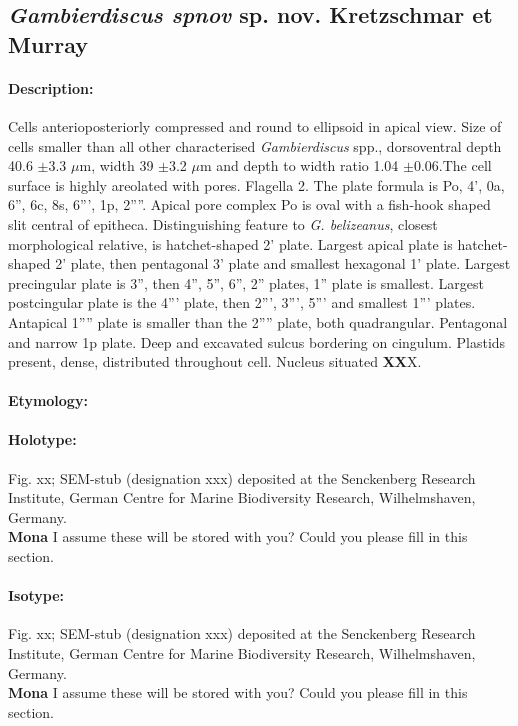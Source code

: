 \documentclass[12pt]{article}
\begin{document}
 \subsection{\emph{Gambierdiscus spnov} sp. nov. Kretzschmar et Murray}
 \paragraph{Description:} Cells anterioposteriorly compressed and round to ellipsoid in apical view. Size of cells smaller than all other characterised \emph{Gambierdiscus} spp., dorsoventral depth 40.6 $\pm$3.3 $\mu$m, width 39 $\pm$3.2 $\mu$m and depth to width ratio 1.04 $\pm$0.06.The cell surface is highly areolated with pores. Flagella 2. The plate formula is Po, 4', 0a, 6'', 6c, 8s, 6''', 1p, 2''''. 
Apical pore complex Po is oval with a fish-hook shaped slit central of epitheca. Distinguishing feature to \emph{G. belizeanus}, closest morphological relative, is hatchet-shaped 2' plate. Largest apical plate is hatchet-shaped 2' plate, then pentagonal 3' plate and smallest hexagonal 1' plate. Largest precingular plate is 3'', then 4'', 5'', 6'', 2'' plates, 1'' plate is smallest. Largest postcingular plate is the 4''' plate, then 2''', 3''', 5''' and smallest 1''' plates. Antapical 1'''' plate is smaller than the 2'''' plate, both quadrangular. Pentagonal and narrow 1p plate. Deep and excavated sulcus bordering on cingulum. Plastids present, dense, distributed throughout cell. Nucleus situated \textbf{XX}X.
 \paragraph{Etymology:} %
\paragraph{Holotype:} Fig. xx; SEM-stub (designation xxx) deposited at the Senckenberg Research Institute, German Centre for Marine Biodiversity Research, Wilhelmshaven, Germany. \\
\textbf{Mona} I assume these will be stored with you? Could you please fill in this section.
\paragraph{Isotype:} Fig. xx; SEM-stub (designation xxx) deposited at the Senckenberg Research Institute, German Centre for Marine Biodiversity Research, Wilhelmshaven, Germany. \\
\textbf{Mona} I assume these will be stored with you? Could you please fill in this section.
\end{document}
